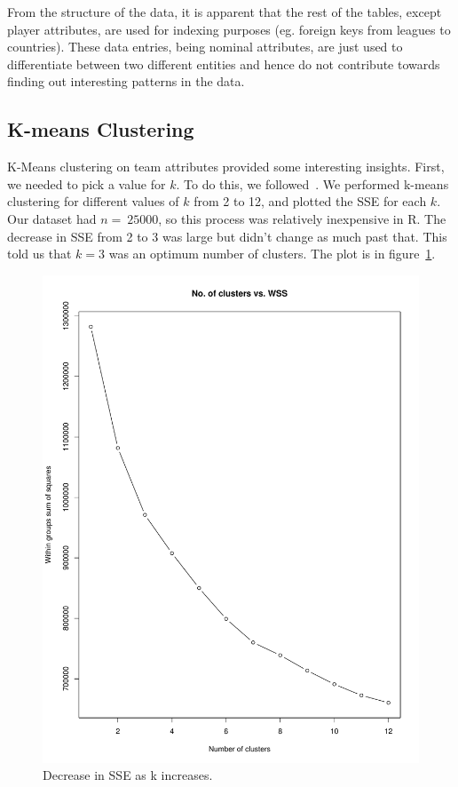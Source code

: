 \documentclass[11pt]{article}
\begin{document}
From the structure of the data, it is apparent that the rest of the tables, except player attributes, are used for indexing purposes (eg. foreign keys from leagues to countries).
These data entries, being nominal attributes, are just used to differentiate between two different entities and hence do not contribute towards finding out interesting patterns in the data.

\subsection{K-means Clustering}
K-Means clustering on team attributes provided some interesting insights.
First, we needed to pick a value for $k$.
To do this, we followed~\cite{cluster1}.
We performed k-means clustering for different values of $k$ from 2 to 12, and plotted the SSE for each $k$.
Our dataset had $n = ~25000$, so this process was relatively inexpensive in R.
The decrease in SSE from 2 to 3 was large but didn't change as much past that.
This told us that $k=3$ was an optimum number of clusters.
The plot is in figure~\ref{fig:sse}.

\begin{figure}[ht!]
  \centering
  \includegraphics[scale=0.5]{wss}
  \caption{Decrease in SSE as k increases.}
  \label{fig:sse}
\end{figure}
\end{document}
